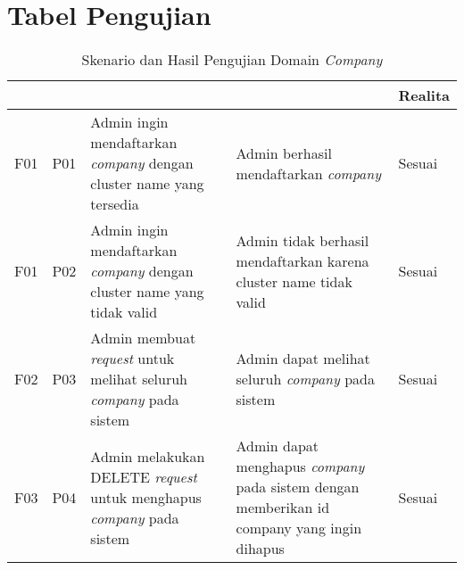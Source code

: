 \chapter{Tabel Pengujian}
\label{chapter:tabel-pengujian}

\bgroup
\begin{table}[ht]
  \def\arraystretch{1.5}
  \caption{Skenario dan Hasil Pengujian Domain \textit{Company}}
  \label{tab:pengujian-domain-company}
  \centering
  \begin{tabular}{|p{2cm}|p{2cm}|p{3cm}|p{3cm}|p{1.5cm}|}
    \hline
    \centering{ID Fungsional} & \centering{ID Pengujian} & \centering{Skenario}                                                                 & \centering{Ekspektasi}                                                                             & Realita \\
    \hline
    F01                       & P01                      & Admin ingin mendaftarkan \textit{company} dengan cluster name yang tersedia          & Admin berhasil mendaftarkan \textit{company}                                                       & Sesuai  \\
    \hline
    F01                       & P02                      & Admin ingin mendaftarkan \textit{company} dengan cluster name yang tidak valid       & Admin tidak berhasil mendaftarkan karena cluster name tidak valid                                  & Sesuai  \\
    \hline
    F02                       & P03                      & Admin membuat \textit{request} untuk melihat seluruh \textit{company} pada sistem    & Admin dapat melihat seluruh \textit{company} pada sistem                                           & Sesuai  \\
    \hline
    F03                       & P04                      & Admin melakukan DELETE \textit{request} untuk menghapus \textit{company} pada sistem & Admin dapat menghapus \textit{company} pada sistem dengan memberikan id company yang ingin dihapus & Sesuai  \\
    \hline
  \end{tabular}
\end{table}
\egroup



